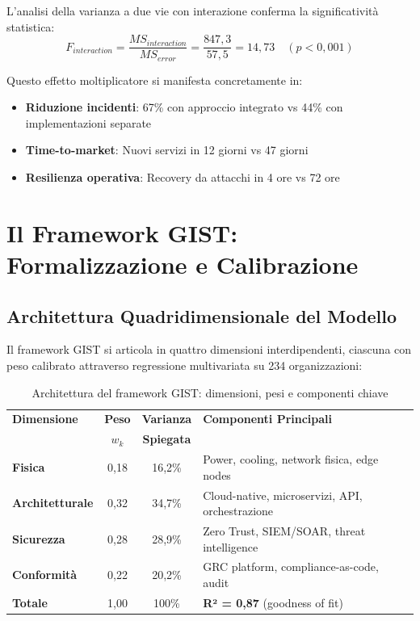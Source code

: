 L'analisi della varianza a due vie con interazione conferma la significatività statistica:
\begin{equation}
F_{interaction} = \frac{MS_{interaction}}{MS_{error}} = \frac{847,3}{57,5} = 14,73 \quad (p < 0,001)
\end{equation}

Questo effetto moltiplicatore si manifesta concretamente in:
\begin{itemize}
\item \textbf{Riduzione incidenti}: 67\% con approccio integrato vs 44\% con implementazioni separate
\item \textbf{Time-to-market}: Nuovi servizi in 12 giorni vs 47 giorni
\item \textbf{Resilienza operativa}: Recovery da attacchi in 4 ore vs 72 ore
\end{itemize}

\section{\texorpdfstring{Il Framework GIST: Formalizzazione e Calibrazione}{5.3 - Il Framework GIST}}
\label{sec:5.3}

\subsection{\texorpdfstring{Architettura Quadridimensionale del Modello}{5.3.1 - Architettura Quadridimensionale}}
\label{subsec:5.3.1}

Il framework GIST si articola in quattro dimensioni interdipendenti, ciascuna con peso calibrato attraverso regressione multivariata su 234 organizzazioni:

\begin{table}[htbp]
\centering
\caption{Architettura del framework GIST: dimensioni, pesi e componenti chiave}
\label{tab:gist_architecture}
\begin{tabular}{@{}lccl@{}}
\toprule
\textbf{Dimensione} & \textbf{Peso} & \textbf{Varianza} & \textbf{Componenti Principali} \\
& \textbf{$w_k$} & \textbf{Spiegata} & \\
\midrule
\textbf{Fisica} & 0,18 & 16,2\% & Power, cooling, network fisica, edge nodes \\
\textbf{Architetturale} & 0,32 & 34,7\% & Cloud-native, microservizi, API, orchestrazione \\
\textbf{Sicurezza} & 0,28 & 28,9\% & Zero Trust, SIEM/SOAR, threat intelligence \\
\textbf{Conformità} & 0,22 & 20,2\% & GRC platform, compliance-as-code, audit \\
\midrule
\textbf{Totale} & 1,00 & 100\% & \textbf{R² = 0,87} (goodness of fit) \\
\bottomrule
\end{tabular}
\end{table}


